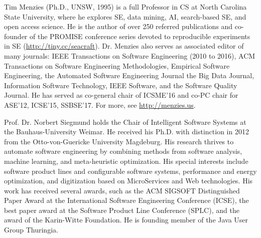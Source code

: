 \documentclass[10pt,journal,compsoc]{IEEEtran}
\begin{document}
\begin{IEEEbiography}
{Tim Menzies} (Ph.D., UNSW, 1995) is a full Professor in CS at North Carolina State University, where he explores SE, data mining, AI, search-based SE, and open access science. He is the author of over 250 referred publications and co-founder of the PROMISE conference series devoted to reproducible experiments in SE (\url{http://tiny.cc/seacraft}).  Dr. Menzies also serves as associated editor of many journals:  IEEE Transactions on Software Engineering (2010 to 2016), ACM Transactions on Software Engineering Methodologies, Empirical Software Engineering, the Automated Software Engineering Journal the Big Data Journal, Information Software Technology, IEEE Software, and the Software Quality Journal. He has served as co-general chair of ICSME'16 and  co-PC chair for ASE'12,  ICSE'15, SSBSE'17. For more, see \url{http://menzies.us}.
\end{IEEEbiography}


\begin{IEEEbiography}
{Prof. Dr. Norbert Siegmund} holds the Chair of Intelligent Software Systems at the Bauhaus-University Weimar. He received his Ph.D. with distinction in 2012 from the Otto-von-Guericke University Magdeburg. His research thrives to automate software engineering by combining methods from software analysis, machine learning, and meta-heuristic optimization. His special interests include software product lines and configurable software systems, performance and energy optimization, and digitization based on MicroServices and Web technologies. His work has received several awards, such as the ACM SIGSOFT Distinguished Paper Award at the International Software Engineering Conference (ICSE), the best paper award at the Software Product Line Conference (SPLC), and the award of the Karin-Witte Foundation. He is founding member of the Java User Group Thuringia.
\end{IEEEbiography}
\end{document}
